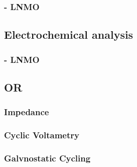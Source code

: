 \documentclass[Main/main.tex]{subfiles}
\begin{document}
\subsubsection{ - LNMO}




\subsection{Electrochemical analysis}

\subsubsection{}



\subsubsection{}


\subsubsection{ - LNMO}


\subsection{\textbf{OR}}

\subsubsection{Impedance}

\subsubsection{Cyclic Voltametry}

\subsubsection{Galvnostatic Cycling}
\end{document}
